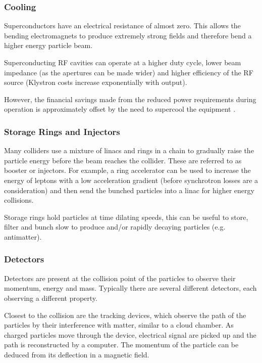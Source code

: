  \subsubsection{Cooling}
 
 Superconductors have an electrical resistance of almost zero. This allows the bending electromagnets to produce extremely strong fields and therefore bend a higher energy particle beam.
 
 Superconducting RF cavities can operate at a higher duty cycle, lower beam impedance (as the apertures can be made wider) and higher efficiency of the RF source (Klystron costs increase exponentially with output). 
 
 However, the financial savings made from the reduced power requirements during operation is approximately offset by the need to supercool the equipment \cite{ILC:TechnicalDesignReport}.
 
 \subsubsection{Storage Rings and Injectors}
 
Many colliders use a mixture of linacs and rings in a chain to gradually raise the particle energy before the beam reaches the collider. These are referred to as booster or injectors. For example, a ring accelerator can be used to increase the energy of leptons with a low acceleration gradient (before synchrotron losses are a consideration) and then send the bunched particles into a linac for higher energy collisions.

Storage rings hold particles at time dilating speeds, this can be useful to store, filter and bunch slow to produce and/or rapidly decaying particles (e.g. antimatter).

 \subsubsection{Detectors}
  
 Detectors are present at the collision point of the particles to observe their momentum, energy and mass. Typically there are several different detectors, each observing a different property. 
 
 Closest to the collision are the tracking devices, which observe the path of the particles by their interference with matter, similar to a cloud chamber. As charged particles move through the device, electrical signal are picked up and the path is reconstructed by a computer. The momentum of the particle can be deduced from its deflection in a magnetic field.
 

